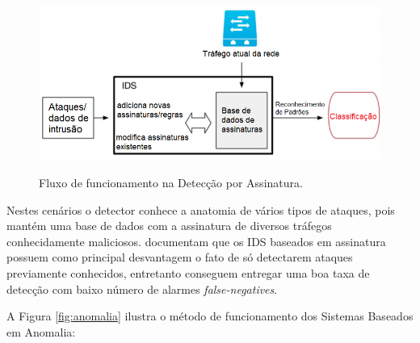 \begin{figure}[H]
\centering
\caption{Fluxo de funcionamento na Detecção por Assinatura.} \includegraphics[width=12cm,height=\textwidth,keepaspectratio]{figs/assinatura.png}
\newline {}\label{fig:assinatura}
\end{figure}

Nestes cenários o detector conhece a anatomia de vários tipos de ataques, pois mantém uma base de dados com a assinatura de diversos tráfegos conhecidamente maliciosos.  documentam que os IDS baseados em assinatura possuem como principal desvantagem o fato de só detectarem ataques previamente conhecidos, entretanto conseguem entregar uma boa taxa de detecção com baixo número de alarmes \textit{false-negatives}.

A Figura \ref{fig:anomalia} ilustra o método de funcionamento dos Sistemas Baseados em Anomalia:

